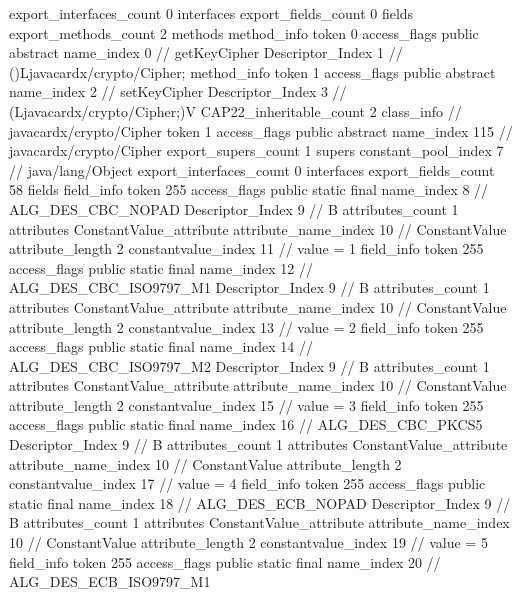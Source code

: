 {{{			export_interfaces_count	0
			interfaces {
			}
			export_fields_count	0
			fields {
			}
			export_methods_count	2
			methods {
				method_info {
					token	0
					access_flags	public abstract
					name_index	0		// getKeyCipher
					Descriptor_Index	1		// ()Ljavacardx/crypto/Cipher;
				}
				method_info {
					token	1
					access_flags	public abstract
					name_index	2		// setKeyCipher
					Descriptor_Index	3		// (Ljavacardx/crypto/Cipher;)V
				}
			}
			CAP22_inheritable_count	2
		}
		class_info {		// javacardx/crypto/Cipher
			token	1
			access_flags	public abstract
			name_index	115		// javacardx/crypto/Cipher
			export_supers_count	1
			supers {
				constant_pool_index	7		// java/lang/Object
			}
			export_interfaces_count	0
			interfaces {
			}
			export_fields_count	58
			fields {
			field_info {
				token	255
				access_flags	public static final
				name_index	8		// ALG_DES_CBC_NOPAD
				Descriptor_Index	9		// B
				attributes_count	1
				attributes {
				ConstantValue_attribute {
					attribute_name_index	10		// ConstantValue
					attribute_length	2
					constantvalue_index	11		// value = 1
				}
				}
			}
			field_info {
				token	255
				access_flags	public static final
				name_index	12		// ALG_DES_CBC_ISO9797_M1
				Descriptor_Index	9		// B
				attributes_count	1
				attributes {
				ConstantValue_attribute {
					attribute_name_index	10		// ConstantValue
					attribute_length	2
					constantvalue_index	13		// value = 2
				}
				}
			}
			field_info {
				token	255
				access_flags	public static final
				name_index	14		// ALG_DES_CBC_ISO9797_M2
				Descriptor_Index	9		// B
				attributes_count	1
				attributes {
				ConstantValue_attribute {
					attribute_name_index	10		// ConstantValue
					attribute_length	2
					constantvalue_index	15		// value = 3
				}
				}
			}
			field_info {
				token	255
				access_flags	public static final
				name_index	16		// ALG_DES_CBC_PKCS5
				Descriptor_Index	9		// B
				attributes_count	1
				attributes {
				ConstantValue_attribute {
					attribute_name_index	10		// ConstantValue
					attribute_length	2
					constantvalue_index	17		// value = 4
				}
				}
			}
			field_info {
				token	255
				access_flags	public static final
				name_index	18		// ALG_DES_ECB_NOPAD
				Descriptor_Index	9		// B
				attributes_count	1
				attributes {
				ConstantValue_attribute {
					attribute_name_index	10		// ConstantValue
					attribute_length	2
					constantvalue_index	19		// value = 5
				}
				}
			}
			field_info {
				token	255
				access_flags	public static final
				name_index	20		// ALG_DES_ECB_ISO9797_M1
}}}}}
